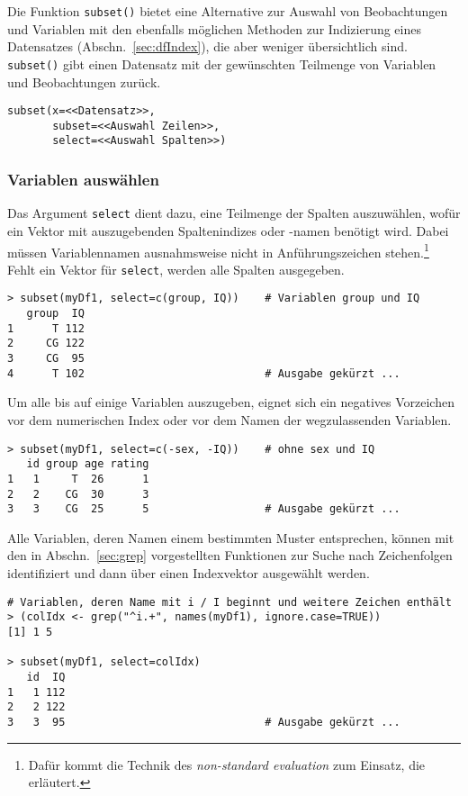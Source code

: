 Die Funktion \lstinline!subset()! bietet eine Alternative zur Auswahl von Beobachtungen und Variablen mit den ebenfalls möglichen Methoden zur Indizierung eines Datensatzes (Abschn.\ \ref{sec:dfIndex}), die aber weniger übersichtlich sind. \lstinline!subset()! gibt einen Datensatz mit der gewünschten Teilmenge von Variablen und Beobachtungen zurück.
\begin{lstlisting}
subset(x=<<Datensatz>>,
       subset=<<Auswahl Zeilen>>,
       select=<<Auswahl Spalten>>)
\end{lstlisting}

\subsubsection{Variablen auswählen}

Das Argument \lstinline!select! dient dazu, eine Teilmenge der Spalten auszuwählen, wofür ein Vektor mit auszugebenden Spaltenindizes oder -namen benötigt wird. Dabei müssen Variablennamen ausnahmsweise nicht in Anführungszeichen stehen.\footnote{\label{ftn:nse}Dafür kommt die Technik des \emph{non-standard evaluation} zum Einsatz, die  erläutert.} Fehlt ein Vektor für \lstinline!select!, werden alle Spalten ausgegeben.
\begin{lstlisting}
> subset(myDf1, select=c(group, IQ))    # Variablen group und IQ
   group  IQ
1      T 112
2     CG 122
3     CG  95
4      T 102                            # Ausgabe gekürzt ...
\end{lstlisting}

Um alle bis auf einige Variablen auszugeben, eignet sich ein negatives Vorzeichen vor dem numerischen Index oder vor dem Namen der wegzulassenden Variablen.
\begin{lstlisting}
> subset(myDf1, select=c(-sex, -IQ))    # ohne sex und IQ
   id group age rating
1   1     T  26      1
2   2    CG  30      3
3   3    CG  25      5                  # Ausgabe gekürzt ...
\end{lstlisting}

Alle Variablen, deren Namen einem bestimmten Muster entsprechen, können mit den in Abschn.\ \ref{sec:grep} vorgestellten Funktionen zur Suche nach Zeichenfolgen identifiziert und dann über einen Indexvektor ausgewählt werden.
\begin{lstlisting}
# Variablen, deren Name mit i / I beginnt und weitere Zeichen enthält
> (colIdx <- grep("^i.+", names(myDf1), ignore.case=TRUE))
[1] 1 5

> subset(myDf1, select=colIdx)
   id  IQ
1   1 112
2   2 122
3   3  95                               # Ausgabe gekürzt ...
\end{lstlisting}


